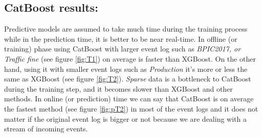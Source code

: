 \subsection{CatBoost results:} \label{cr}
Predictive models are assumed to take much time during the training process while in the prediction time, it is better to be near real-time. In offline (or training) phase using CatBoost with larger event log such as \textit{BPIC2017, or Traffic fine} (see figure \ref{fig:T1}) on average is faster than XGBoost. On the other hand, using it with smaller event logs such as \textit{Production} it's more or less the same as XGBoost (see figure \ref{fig:T2}). \textit{Sparse} data is a bottleneck to  CatBoost during the training step, and it becomes slower than XGBoost and other methods.  In online (or prediction) time we can say that CatBoost is on average the fastest method (see figure \ref{fig:pT2}) in most of the event logs and it does not matter if the original event log is bigger or not because we are dealing with a stream of incoming events.



